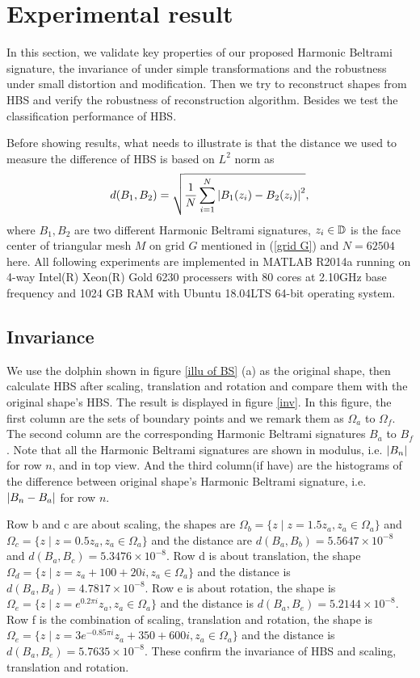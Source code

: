 \documentclass[review,onefignum,onetabnum]{siamonline190516}
\begin{document}
    \section{Experimental result}\label{result}
        In this section, we validate key properties of our proposed Harmonic Beltrami signature, the invariance of under simple transformations and the robustness under small distortion and modification. Then we try to reconstruct shapes from HBS and verify the robustness of reconstruction algorithm. Besides we test the classification performance of HBS.

        Before showing results, what needs to illustrate is that the distance we used to measure the difference of HBS is based on $L^2$ norm as
        \begin{equation}\label{bs dis}
            d(B_1, B_2) = \sqrt{\frac{1}{N} \sum_{i=1}^N \abs{B_1(z_i) - B_2(z_i)}^2},
        \end{equation}
        where $B_1, B_2$ are two different Harmonic Beltrami signatures, $z_i \in \mathbb{D}$ is the face center of triangular mesh $M$ on grid $G$ mentioned in (\ref{grid G}) and $N=62504$ here. All following experiments are implemented in MATLAB R2014a running on 4-way Intel(R) Xeon(R) Gold 6230 processers with 80 cores at 2.10GHz base frequency and 1024 GB RAM with Ubuntu 18.04LTS 64-bit operating system.

    \subsection{Invariance}\label{sec inv}
        We use the dolphin shown in figure \ref{illu of BS} (a) as the original shape, then calculate HBS after scaling, translation and rotation and compare them with the original shape's HBS. The result is displayed in figure \ref{inv}. In this figure, the first column are the sets of boundary points and we remark them as $\Omega_a$ to $\Omega_f$. The second column are the corresponding Harmonic Beltrami signatures $B_a$ to $B_f$. Note that all the Harmonic Beltrami signatures are shown in modulus, i.e. $\left\vert B_n \right\vert$ for row $n$, and in top view. And the third column(if have) are the histograms of the difference between original shape's Harmonic Beltrami signature, i.e. $\left\vert B_n - B_a \right\vert$ for row $n$.
        
        Row b and c are about scaling, the shapes are $\Omega_b = \{z \mid z = 1.5 z_a, z_a \in \Omega_a \}$ and $\Omega_c = \{z \mid z = 0.5 z_a, z_a \in \Omega_a \}$ and the distance are $d(B_a, B_b) = 5.5647 \times 10^{-8}$ and $d(B_a, B_c) = 5.3476 \times 10^{-8}$. Row d is about translation, the shape $\Omega_d = \{z \mid z = z_a+100+20i, z_a \in \Omega_a \}$ and the distance is $d(B_a, B_d) = 4.7817 \times 10^{-8}$. Row e is about rotation, the shape is $\Omega_e = \{z \mid z = e^{0.2\pi i} z_a, z_a \in \Omega_a \}$ and the distance is $d(B_a, B_e) = 5.2144 \times 10^{-8}$. Row f is the combination of scaling, translation and rotation, the shape is $\Omega_e = \{z \mid z = 3e^{-0.85\pi i} z_a+350+600i, z_a \in \Omega_a \}$ and the distance is $d(B_a, B_e) = 5.7635 \times 10^{-8}$. These confirm the invariance of HBS and scaling, translation and rotation.
\end{document}
